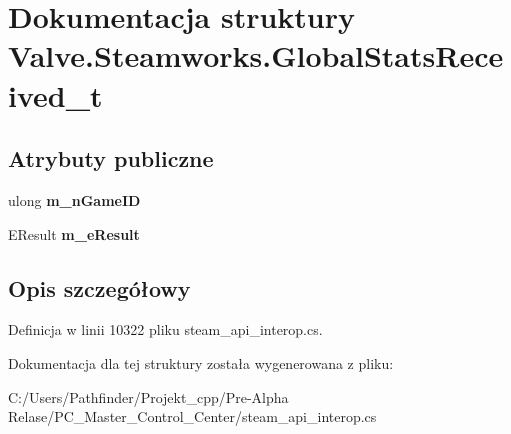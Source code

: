 \hypertarget{struct_valve_1_1_steamworks_1_1_global_stats_received__t}{}\section{Dokumentacja struktury Valve.\+Steamworks.\+Global\+Stats\+Received\+\_\+t}
\label{struct_valve_1_1_steamworks_1_1_global_stats_received__t}
\subsection*{Atrybuty publiczne}
\begin{DoxyCompactItemize}
\item 
\mbox{\label{struct_valve_1_1_steamworks_1_1_global_stats_received__t_aa5591ac8ee4ebd6f1d378860d526752c}} 
ulong {\bfseries m\+\_\+n\+Game\+ID}
\item 
\mbox{\label{struct_valve_1_1_steamworks_1_1_global_stats_received__t_a98c41add485b559849a3782261206d8f}} 
E\+Result {\bfseries m\+\_\+e\+Result}
\end{DoxyCompactItemize}


\subsection{Opis szczegółowy}


Definicja w linii 10322 pliku steam\+\_\+api\+\_\+interop.\+cs.



Dokumentacja dla tej struktury została wygenerowana z pliku\+:\begin{DoxyCompactItemize}
\item 
C\+:/\+Users/\+Pathfinder/\+Projekt\+\_\+cpp/\+Pre-\/\+Alpha Relase/\+P\+C\+\_\+\+Master\+\_\+\+Control\+\_\+\+Center/steam\+\_\+api\+\_\+interop.\+cs\end{DoxyCompactItemize}
